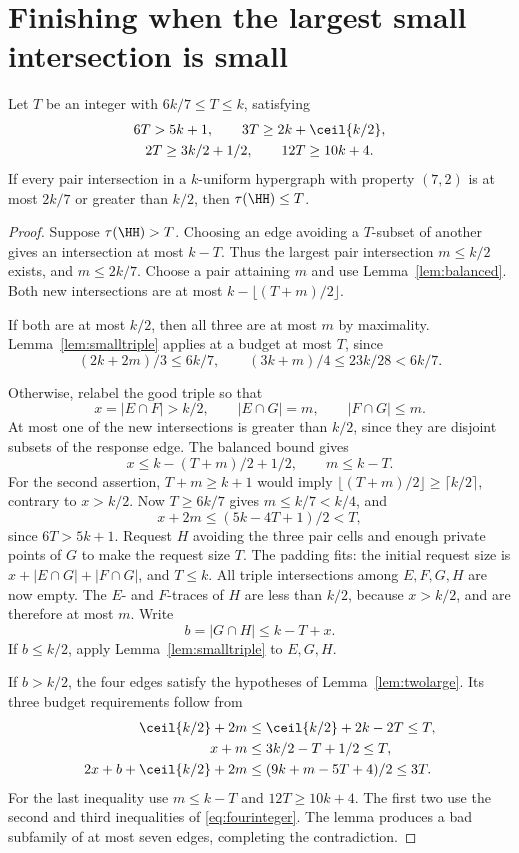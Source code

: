 \section{Finishing when the largest small intersection is small}\label{app:smallmax}
\begin{lemma}\label{lem:smallmax}
Let $T$ be an integer with $6k/7\le T\le k$, satisfying
\begin{equation}\label{eq:fourinteger}
 \begin{gathered}
 6T>5k+1,\qquad 3T\ge2k+\ceil{k/2},\\
 2T\ge3k/2+1/2,\qquad 12T\ge10k+4.
 \end{gathered}
\end{equation}
If every pair intersection in a $k$-uniform hypergraph with property
$(7,2)$ is at most $2k/7$ or greater than $k/2$, then $\tau(\HH)\le T$.
\end{lemma}
\begin{proof}
Suppose $\tau(\HH)>T$. Choosing an edge avoiding a $T$-subset of
another gives an intersection at most $k-T$. Thus the largest pair
intersection $m\le k/2$ exists, and $m\le2k/7$. Choose a pair attaining
$m$ and use Lemma~\ref{lem:balanced}. Both new intersections are at most
$k-\lfloor(T+m)/2\rfloor$.

If both are at most $k/2$, then all three are at most $m$ by maximality.
Lemma~\ref{lem:smalltriple} applies at a budget at most $T$, since
\[
 (2k+2m)/3\le6k/7,\qquad (3k+m)/4\le23k/28<6k/7.
\]

Otherwise, relabel the good triple so that
\[
 x=|E\cap F|>k/2,\qquad |E\cap G|=m,\qquad |F\cap G|\le m.
\]
At most one of the new intersections is greater than $k/2$, since they
are disjoint subsets of the response edge. The balanced bound gives
\begin{equation}\label{eq:smallmaxbounds}
 x\le k-(T+m)/2+1/2,\qquad m\le k-T.
\end{equation}
For the second assertion, $T+m\ge k+1$ would imply
$\lfloor(T+m)/2\rfloor\ge\lceil k/2\rceil$, contrary to $x>k/2$.
Now $T\ge6k/7$ gives $m\le k/7<k/4$, and
\[
 x+2m\le(5k-4T+1)/2<T,
\]
since $6T>5k+1$. Request $H$ avoiding the three pair cells and enough
private points of $G$ to make the request size $T$. The padding fits:
the initial request size is $x+|E\cap G|+|F\cap G|$, and $T\le k$.
All triple intersections among $E,F,G,H$ are now empty. The $E$- and
$F$-traces of $H$ are less than $k/2$, because $x>k/2$, and are
therefore at most $m$. Write
\[
 b=|G\cap H|\le k-T+x.
\]
If $b\le k/2$, apply Lemma~\ref{lem:smalltriple} to $E,G,H$.

If $b>k/2$, the four edges satisfy the hypotheses of
Lemma~\ref{lem:twolarge}. Its three budget requirements follow from
\begin{align*}
 \ceil{k/2}+2m
   &\le\ceil{k/2}+2k-2T\le T,\\
 x+m&\le3k/2-T+1/2\le T,\\
 2x+b+\ceil{k/2}+2m
   &\le(9k+m-5T+4)/2\le3T.
\end{align*}
For the last inequality use $m\le k-T$ and $12T\ge10k+4$.
The first two use the second and third inequalities of
\eqref{eq:fourinteger}. The lemma produces a bad subfamily of at most seven
edges, completing the contradiction.
\end{proof}
